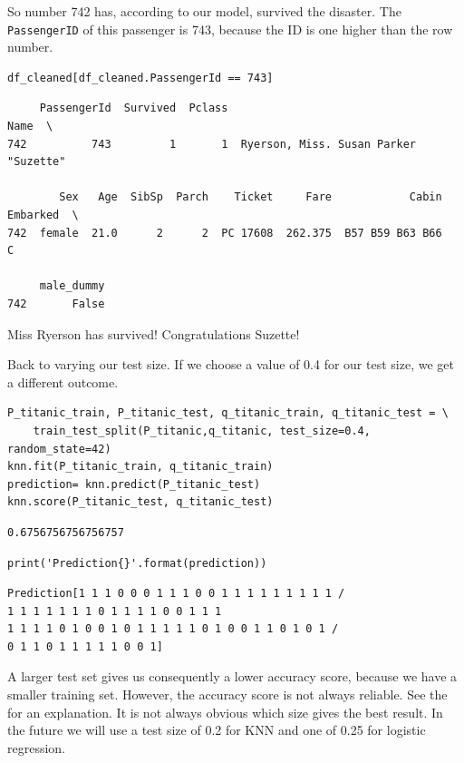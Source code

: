 \documentclass[11pt]{article}
\begin{document}
So number 742 has, according to our model, survived the disaster. The \texttt{PassengerID} of this passenger is 743, because the ID is one higher than the row number. 

\begin{verbatim}
df_cleaned[df_cleaned.PassengerId == 743]
\end{verbatim}

\begin{verbatim}
     PassengerId  Survived  Pclass                                   Name  \
742          743         1       1  Ryerson, Miss. Susan Parker "Suzette"   

        Sex   Age  SibSp  Parch    Ticket     Fare            Cabin Embarked  \
742  female  21.0      2      2  PC 17608  262.375  B57 B59 B63 B66        C   

     male_dummy  
742       False  
\end{verbatim}

Miss Ryerson has survived! Congratulations Suzette!


Back to varying our test size. If we choose a value of 0.4 for our test size, we get a different outcome.

\begin{verbatim}
P_titanic_train, P_titanic_test, q_titanic_train, q_titanic_test = \
    train_test_split(P_titanic,q_titanic, test_size=0.4, random_state=42)
knn.fit(P_titanic_train, q_titanic_train)
prediction= knn.predict(P_titanic_test)
knn.score(P_titanic_test, q_titanic_test)

\end{verbatim}

\begin{verbatim}
0.6756756756756757
\end{verbatim}

\begin{verbatim}
print('Prediction{}'.format(prediction))
\end{verbatim}

\begin{verbatim}
Prediction[1 1 1 0 0 0 1 1 1 0 0 1 1 1 1 1 1 1 1 1 /
1 1 1 1 1 1 1 0 1 1 1 1 0 0 1 1 1
1 1 1 1 0 1 0 0 1 0 1 1 1 1 1 0 1 0 0 1 1 0 1 0 1 /
0 1 1 0 1 1 1 1 1 0 0 1]

\end{verbatim}


A larger test set gives us consequently a lower accuracy score, because we have a smaller training set. However, the accuracy score is not always reliable. See the for an explanation. It is not always obvious which size gives the best result. In the future we will use a test size of 0.2 for KNN and one of 0.25 for logistic regression. 
\end{document}
